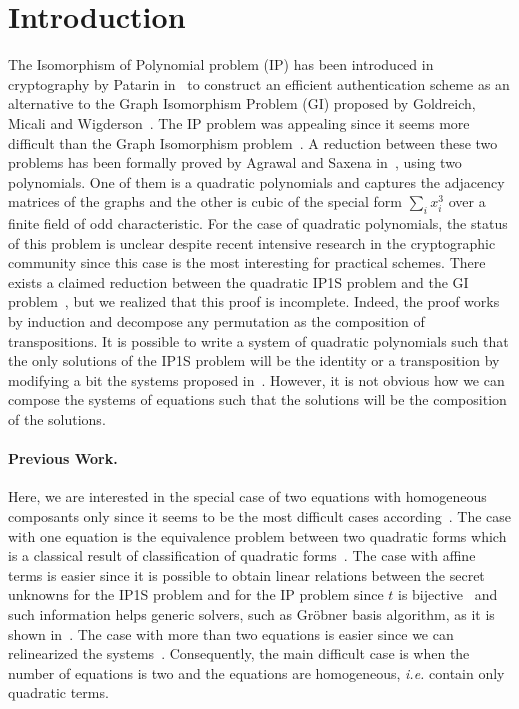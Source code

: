 \documentclass{lms}%
\begin{document}
\section{Introduction}
The Isomorphism of Polynomial problem (IP) has been introduced in cryptography by Patarin in~\cite{DBLP:conf/eurocrypt/Patarin96} to construct an efficient authentication scheme 
as an alternative to the Graph Isomorphism Problem (GI) proposed by Goldreich, Micali and Wigderson~\cite{DBLP:journals/jacm/GoldreichMW91}. The IP problem was appealing since 
it seems more difficult than the Graph Isomorphism problem~\cite{DBLP:conf/eurocrypt/PatarinGC98}. 
A reduction between these
two problems has been formally proved by Agrawal and Saxena in~\cite{DBLP:conf/stacs/AgrawalS06}, 
using two polynomials. One of them is a quadratic polynomials and captures the adjacency 
matrices of the graphs and the other is cubic of the special form $\sum_{i} x_i^3$ over a 
finite field of odd characteristic. 
For the case of quadratic polynomials, the status of this problem is unclear despite recent 
intensive research in the cryptographic community since this case is the most interesting 
for practical schemes. There exists a claimed reduction between the quadratic IP1S problem and the GI
problem~\cite{DBLP:conf/eurocrypt/PatarinGC98}, but we realized that this proof is incomplete. 
Indeed, the proof works by induction and decompose any permutation as the composition of 
transpositions. It is possible to write a system of quadratic polynomials such that the only solutions 
of the IP1S problem will be the identity or a transposition by modifying a bit the systems proposed 
in~\cite{DBLP:conf/eurocrypt/PatarinGC98}. However, it is not obvious how we can compose the systems 
of equations such that the solutions will be the composition of the solutions. 


\paragraph{Previous Work.}
Here, we are interested in the special case of two equations with homogeneous composants only 
since it seems to be the most difficult cases according~\cite{DBLP:conf/eurocrypt/Perret05,DBLP:conf/eurocrypt/FaugereP06,DBLP:conf/pkc/BouillaguetFFP11,DBLP:conf/eurocrypt/BouillaguetFV13}. 
The case with one equation is the equivalence problem between two quadratic forms which 
is a classical result of classification of quadratic forms~\cite{lidl1997finite}. The case with 
affine terms is easier since it is possible to obtain linear relations between the secret unknowns
for the IP1S problem and for the IP problem since $t$ is bijective~\cite{DBLP:conf/eurocrypt/PatarinGC98} 
and such information helps generic solvers, such as Gröbner basis algorithm, as it is shown in~\cite{DBLP:conf/eurocrypt/FaugereP06}.  
The case with more than two equations is easier since we can relinearized the 
systems~\cite{DBLP:conf/pkc/BouillaguetFFP11}. Consequently, the main difficult case is when the 
number of equations is two and the equations are homogeneous, \textit{i.e.} contain only quadratic terms. 
\end{document}
